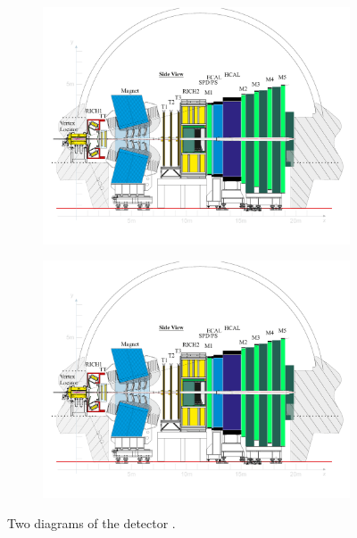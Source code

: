 \documentclass[a4paper]{article}
\begin{document}
\begin{figure}[ht]
    \centering
    \begin{subfigure}{0.49\textwidth}
        \centering
        \includegraphics[clip, trim=0.5cm 2cm 0.5cm 0cm,width=1\textwidth]{figures/lhcb.pdf}
        \subcaption{\lhcb}
    \end{subfigure}
    \begin{subfigure}{0.49\textwidth}
        \centering
        \includegraphics[clip, trim=0.5cm 2cm 0.5cm 0cm,width=1\textwidth]{figures/lhcb.pdf}
        \subcaption{\lhcb}
    \end{subfigure}
    \caption{Two diagrams of the \lhcb detector \cite{LHCbDetectorGeometry}.}
    \label{fig:pvalsFiducial2k2piPodd}
\end{figure}
\end{document}
